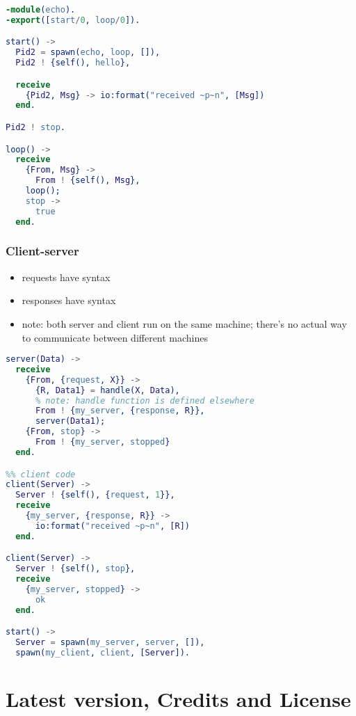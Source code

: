 \documentclass[a4paper,landscape,10pt]{article}
\begin{document}
\begin{multicols*}{2}
  \begin{lstlisting}[language=Erlang]
-module(echo).
-export([start/0, loop/0]).

start() ->
  Pid2 = spawn(echo, loop, []),
  Pid2 ! {self(), hello},

  receive
    {Pid2, Msg} -> io:format("received ~p~n", [Msg])
  end.

Pid2 ! stop.

loop() ->
  receive
    {From, Msg} ->
      From ! {self(), Msg},
    loop();
    stop ->
      true
  end.
\end{lstlisting}

  \breakcolumn

  \subsubsection{Client-server}

  \begin{itemize}
    \item requests have syntax 
    \item responses have syntax 
    \item note: both server and client run on the same machine; there's no actual way to communicate between different machines
  \end{itemize}

  \begin{lstlisting}[language=Erlang]
%% server code
server(Data) ->
  receive
    {From, {request, X}} ->
      {R, Data1} = handle(X, Data),
      % note: handle function is defined elsewhere
      From ! {my_server, {response, R}},
      server(Data1);
    {From, stop} ->
      From ! {my_server, stopped}
  end.

%% client code
client(Server) ->
  Server ! {self(), {request, 1}},
  receive
    {my_server, {response, R}} ->
      io:format("received ~p~n", [R])
  end.

client(Server) ->
  Server ! {self(), stop},
  receive
    {my_server, stopped} ->
      ok
  end.

start() ->
  Server = spawn(my_server, server, []),
  spawn(my_client, client, [Server]).
\end{lstlisting}

\end{multicols*}

\clearpage

\section{Latest version, Credits and License}
\end{document}
